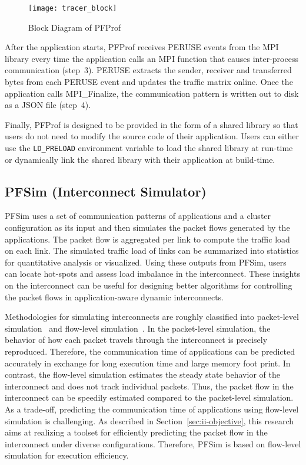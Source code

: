 \begin{figure}
    \centering
    \texttt{[image: tracer\_block]}
    \caption{Block Diagram of PFProf}%
    \label{fig:profiler-block}
\end{figure}

After the application starts, PFProf receives PERUSE events from the MPI
library every time the application calls an MPI function that causes
inter-process communication (step~3). PERUSE extracts the sender, receiver and
transferred bytes from each PERUSE event and updates the traffic matrix
online. Once the application calls MPI\_Finalize, the communication pattern is
written out to disk as a JSON file (step~4).

Finally, PFProf is designed to be provided in the form of a shared library so
that users do not need to modify the source code of their application. Users
can either use the \lstinline!LD_PRELOAD! environment variable to load the
shared library at run-time or dynamically link the shared library with their
application at build-time.

\subsection{PFSim (Interconnect Simulator)}\label{sec:ii-pfsim}

PFSim uses a set of communication patterns of applications and a cluster
configuration as its input and then simulates the packet flows generated
by the applications. The packet flow is aggregated per link to compute
the traffic load on each link. The simulated traffic load of links can
be summarized into statistics for quantitative analysis or visualized.
Using these outputs from PFSim, users can locate hot-spots and assess
load imbalance in the interconnect. These insights on the interconnect
can be useful for designing better algorithms for controlling the packet
flows in application-aware dynamic interconnects.

Methodologies for simulating interconnects are roughly classified into
packet-level simulation~\cite{Hoefler2010} and flow-level
simulation~\cite{Schneider2009}. In the packet-level simulation, the behavior
of how each packet travels through the interconnect is precisely reproduced.
Therefore, the communication time of applications can be predicted accurately
in exchange for long execution time and large memory foot print. In contrast,
the flow-level simulation estimates the steady state behavior of the
interconnect and does not track individual packets. Thus, the packet flow in
the interconnect can be speedily estimated compared to the packet-level
simulation. As a trade-off, predicting the communication time of applications
using flow-level simulation is challenging. As described in
Section~\ref{sec:ii-objective}, this research aims at realizing a toolset for
efficiently predicting the packet flow in the interconnect under diverse
configurations. Therefore, PFSim is based on flow-level simulation for
execution efficiency.

